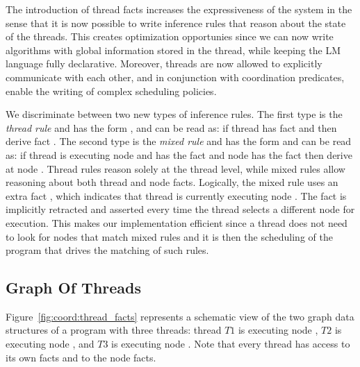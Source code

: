 The introduction of thread facts increases the expressiveness of the system in
the sense that it is now possible to write inference rules that reason about the
state of the threads. This creates optimization opportunies since we can now
write algorithms with global information stored in the thread, while keeping the
LM language fully declarative. Moreover, threads are now allowed to explicitly
communicate with each other, and in conjunction with coordination predicates,
enable the writing of complex scheduling policies.

We discriminate between two new types of inference rules. The first type is the
\emph{thread rule} and has the form , and can be read
as: if thread  has fact  and  then derive fact
. The second type is the \emph{mixed rule} and has the form
 and can be read as: if thread  is executing
node  and has the fact  and node  has the fact
 then derive  at node . Thread rules reason solely
at the thread level, while mixed rules allow reasoning about both thread and
node facts. Logically, the mixed rule uses an extra fact ,
which indicates that thread  is currently executing node . The
 fact is implicitly retracted and asserted every time the thread
selects a different node for execution. This makes our implementation efficient
since a thread does not need to look for nodes that match mixed rules and it is
then the scheduling of the program that drives the matching of such rules.

\subsection{Graph Of Threads}

Figure~\ref{fig:coord:thread_facts} represents a schematic view of the two graph
data structures of a program with three threads: thread $T1$ is executing node
, $T2$ is executing node , and $T3$ is executing node
. Note that every thread has access to its own facts and to the node
facts.


